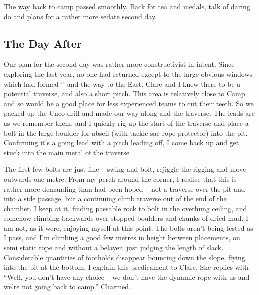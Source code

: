 The way back to camp passed smoothly. Back for tea and medals, talk of
daring do and plans for a rather more sedate second day.


\subsection{The Day After}


Our plan for the second day was rather more constructivist in intent.
Since exploring the  last year, no one had returned
except to the large obvious windows which had formed `' and the way to the East. Clare and I knew there to be a
potential traverse, and also a short pitch. This area is relatively
close to Camp  and so would be a good place for less
experienced teams to cut their teeth. So we packed up the Uneo drill and
made our way along  and the  traverse. The leads are as
we remember them, and I quickly rig up the start of the traverse and
place a bolt in the large boulder for abseil (with tackle sac rope
protector) into the pit. Confirming it's a going lead with a pitch
leading off, I come back up and get stuck into the main metal of the
traverse


The first few bolts are just fine -- swing and bolt, rejiggle the
rigging and move outwards one metre. From my perch around the corner, I
realise that this is rather more demanding than had been hoped -- not a
traverse over the pit and into a side passage, but a continuing climb
traverse out of the end of the chamber. I keep at it, finding passable
rock to bolt in the overhung ceiling, and somehow climbing backwards
over stopped boulders and chunks of dried mud. I am not, as it were,
enjoying myself at this point. The bolts aren't being tested as I pass,
and I'm climbing a good few metres in height between placements, on semi
static rope and without a belayer, just judging the length of slack.
Considerable quantities of footholds disappear bouncing down the slope,
flying into the pit at the bottom. I explain this predicament to Clare.
She replies with ``Well, you don't have any choice -- we don't have the
dynamic rope with us and we're not going back to camp.'' Charmed.

